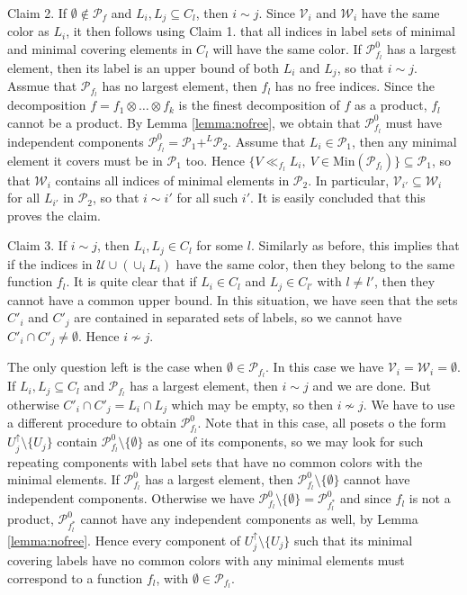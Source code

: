 \documentclass[12pt]{article}
\theoremstyle{definition}
\theoremstyle{remark}
\def\cover{\ll}
\def\Pe{\mathcal P}
\begin{document}
Claim 2. If $\emptyset \notin \Pe_f$ and  $L_i,L_j\subseteq C_l$,  then $i\sim j$. 
Since $\mathcal V_i$ and $\mathcal W_i$ have the same color as $L_i$, it then
follows using Claim 1. that all indices in label sets of minimal and minimal covering elements in $C_l$
will have the same color. If  $\Pe_{f_l}^0$ has a largest element, then its label
is an upper bound of both  $L_i$  and $L_j$, so that $i\sim j$. Assmue that $\Pe_{f_l}$
has no largest element, then $f_l$ has no free indices. Since the decomposition
$f=f_1\otimes \dots\otimes f_k$ is the  finest decomposition of $f$ as a product, $f_l$
cannot be a product. By Lemma \ref{lemma:nofree}, we obtain that $\Pe_{f_l}^0$ must have
independent components $\Pe_{f_l}^0=\Pe_1+^L \Pe_2$. Assume that  $L_i\in \Pe_1$, then any
minimal element it covers must be in $\Pe_1$ too. Hence $\{V\cover_{f_l} L_i,\ V\in
\mathrm{Min}(\Pe_{f_l})\}\subseteq \Pe_1$, so that $\mathcal W_i$ contains all indices of
minimal elements in $\Pe_2$. In particular, $\mathcal V_{i'}\subseteq \mathcal W_i$ for
all $L_{i'}$ in $\Pe_2$, so that $i\sim i'$ for all such $i'$. It is easily concluded that
this proves the claim. 

Claim 3. If $i\sim j$, then $L_i,L_j\in C_l$ for some $l$. Similarly as before, this
implies that if the indices in $\mathcal U \cup (\cup_iL_i)$ have the same color, then
they belong to the same function $f_l$. It is quite clear that if $L_i\in C_l$ and $L_j\in C_{l'}$
with $l\ne l'$, then they cannot have a common upper bound. In this situation, we have
seen that the sets $C'_i$ and $C'_j$ are contained in separated  sets of labels, so we
cannot have $C'_i\cap C'_j\ne \emptyset$. Hence $i\not\sim j$. 

The only question left is the case when $\emptyset \in \Pe_{f_l}$. In this case we have
$\mathcal V_i=\mathcal W_i=\emptyset$. If $L_i,L_j
\subseteq  C_l$ and $\Pe_{f_l}$ has a largest element, then $i\sim j$ and we are done. But
otherwise $C'_i\cap C'_j=L_i\cap L_j$ which may be empty, so then $i\not\sim j$. We have
to use a different procedure to obtain $\Pe_{f_l}^0$. Note that in this case, all posets o
the form 
$U_j^\uparrow\setminus \{U_j\}$  contain
$\Pe_{f_l}^0\setminus\{\emptyset\}$ as one of its components, so we may look for such
repeating components with label sets that have no common colors with the minimal elements. 
If $\Pe_{f_l}^0$ has a largest element, then $\Pe_{f_l}^0\setminus\{\emptyset\}$ cannot
have independent components. Otherwise we have $\Pe_{f_l}^0\setminus\{\emptyset\}=\Pe_{f_l^*}^0$ and since $f_l$ is not a product,
$\Pe_{f_l^*}^0$ cannot have any independent components as well, by Lemma \ref{lemma:nofree}. Hence
every  component of $U_j^\uparrow\setminus \{U_j\}$ such that its  minimal covering labels
have no common colors with any minimal elements must correspond to a function $f_l$, with
$\emptyset \in \Pe_{f_l}$.
\end{document}
